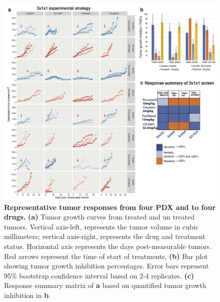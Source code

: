 \begin{figure}
\centering
	\includegraphics[width=\textwidth]{Figures/chap3/4drugs4PDXNew.png}
	\caption[Representative tumor responses from four PDX and  to four drugs]
	{\small
	   \textbf{Representative tumor responses from four PDX and  to four drugs.}
	    \textbf{(a)} Tumor growth curves from treated and un treated tumors. Vertical axis-left, represents the tumor volume in cubic millimeters; vertical axis-right, represents the drug and treatment status. Horizontal axis represents the days post-measurable tumors. Red arrows represent the time of start of treatments,
	   \textbf{(b)} Bar plot showing tumor growth inhibition percentages. Error bars represent 95\% bootstrap confidence interval based on 2-4 replicates.  \textbf{(c)} Response summary matrix of \textbf{a} based on quantified tumor growth inhibition in \textbf{b}.
	    }
	\label{fig:invivo}
\end{figure}



